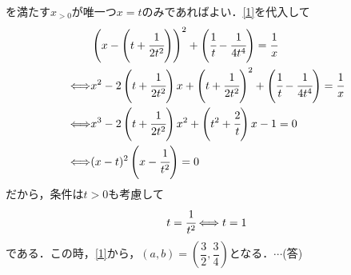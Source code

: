 \documentclass[a4j]{jarticle}
\begin{document}
\begin{multicols}{2}
を満たす$x_{>0}$が唯一つ$x=t$のみであればよい．\eqref{1}を代入して
    \begin{align*}
    &\left(x-\left(t+\cfrac{1}{2t^2}\right)\right)^2+\left(\cfrac{1}{t}-\cfrac{1}{4t^4}\right)=\cfrac{1}{x} \\ 
    \Longleftrightarrow%
    &x^2-2\left(t+\cfrac{1}{2t^2}\right)x+\left(t+\cfrac{1}{2t^2}\right)^2+\left(\cfrac{1}{t}-\cfrac{1}{4t^4}\right)=\cfrac{1}{x} \\
    \Longleftrightarrow%
    &x^3-2\left(t+\cfrac{1}{2t^2}\right)x^2+\left(t^2+\cfrac{2}{t}\right)x-1=0 \\
    \Longleftrightarrow%
    &(x-t)^2\left(x-\cfrac{1}{t^2}\right)=0
    \end{align*}
だから，条件は$t>0$も考慮して
     \[t=\cfrac{1}{t^2}\Longleftrightarrow t=1\]
 である．この時，\eqref{1}から，$(a,b)=\left(\dfrac{3}{2},\dfrac{3}{4}\right)$となる．$\cdots$(答)
\newpage
\end{multicols}
\end{document}
